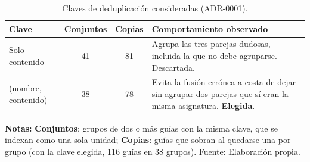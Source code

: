 \begin{table}[htbp]
  \centering
  \small
  \caption{Claves de deduplicación consideradas (ADR-0001).}
  \label{tab:claves_dedup}
  \begin{tabularx}{\textwidth}{@{}>{\raggedright\arraybackslash}p{3.1cm} c c Y@{}}
    \toprule
    \textbf{Clave}      & \textbf{Conjuntos} & \textbf{Copias} & \textbf{Comportamiento observado}                      \\
    \midrule
    Solo contenido      & 41                 & 81              & 
    Agrupa las tres parejas dudosas, incluida la que no debe agruparse. Descartada.                                     \\
    \addlinespace
    (nombre, contenido) & 38                 & 78              & 
    Evita la fusión errónea a costa de dejar sin agrupar dos parejas que sí eran la misma asignatura. \textbf{Elegida}. \\
    \bottomrule
  \end{tabularx}
  \begin{minipage}{0.95\textwidth}
    \vspace{4pt}
    \tiny
    \textbf{Notas:} \textbf{Conjuntos}: grupos de dos o más guías con la misma clave, que se indexan como una sola unidad; \textbf{Copias}: guías que sobran al quedarse una por grupo (con la clave elegida, 116 guías en 38 grupos). Fuente: Elaboración propia.
  \end{minipage}
\end{table}
